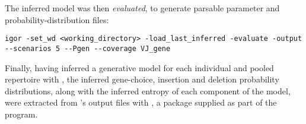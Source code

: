 \noindent The inferred model was then \textit{evaluated}, to generate parsable parameter and probability-distribution files:

\begin{lstlisting}
igor -set_wd <working_directory> -load_last_inferred -evaluate -output --scenarios 5 --Pgen --coverage VJ_gene
\end{lstlisting}

\noindent Finally, having inferred a generative model for each individual and pooled repertoire with , the inferred gene-choice, insertion and deletion probability distributions, along with the inferred entropy of each component of the model, were extracted from 's output files with , a  package supplied as part of the  program.